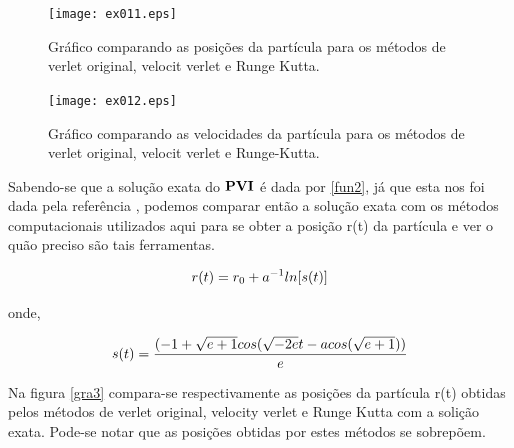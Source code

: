 \documentclass[a4wide]{report}
\begin{document}
 
\begin{figure}[!ht]
\centering
\texttt{[image: ex011.eps]}
\caption{Gráfico comparando as posições da partícula para os métodos de verlet original, velocit verlet e Runge Kutta.}
\label{gra1}
\end{figure}

\newpage

\begin{figure}[!ht]
\centering
\texttt{[image: ex012.eps]}
\caption{Gráfico comparando as velocidades da partícula para os métodos de verlet original, velocit verlet e Runge-Kutta.}
\label{gra2}
\end{figure}



Sabendo-se que a solução exata do $\bf PVI$ é dada por \ref{fun2}, já que esta nos foi dada pela referência \cite{FL}, podemos comparar então
a solução exata com os métodos computacionais utilizados aqui para se obter a posição r(t) da partícula e ver o quão preciso são tais ferramentas.

\begin{equation}
\centering
r(t) = r_0 + a^{-1} ln[s(t)]
\label{fun2}
\end{equation}

onde,

\begin{equation}
\centering
s(t) = \frac{(-1 + \sqrt{e + 1} cos(\sqrt{-2e}t - acos(\sqrt{e + 1}))}{e}
\label{fun3}
\end{equation}

Na figura \ref{gra3} compara-se respectivamente as posições da partícula r(t) obtidas pelos métodos de verlet original, velocity verlet e Runge Kutta com a solição exata.
Pode-se notar que as posições obtidas por estes métodos se sobrepõem.
\end{document}
